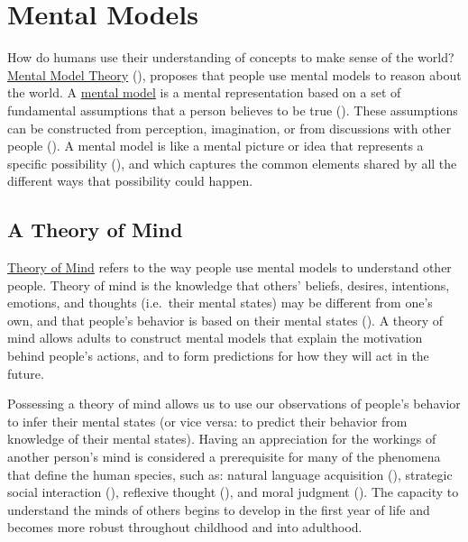 \documentclass[
]{krantz}
\begin{document}
\section{Mental Models}\label{mental-models}

How do humans use their understanding of concepts to make sense of the world? \hyperref[mental-model-theory]{Mental Model Theory} (), proposes that people use mental models to reason about the world. A \hyperref[mental-model]{mental model} is a mental representation based on a set of fundamental assumptions that a person believes to be true (). These assumptions can be constructed from perception, imagination, or from discussions with other people (). A mental model is like a mental picture or idea that represents a specific possibility (), and which captures the common elements shared by all the different ways that possibility could happen.

\subsection*{A Theory of Mind}\label{a-theory-of-mind}


\hyperref[theory-of-mind]{Theory of Mind} refers to the way people use mental models to understand other people. Theory of mind is the knowledge that others' beliefs, desires, intentions, emotions, and thoughts (i.e.~their mental states) may be different from one's own, and that people's behavior is based on their mental states (). A theory of mind allows adults to construct mental models that explain the motivation behind people's actions, and to form predictions for how they will act in the future.

Possessing a theory of mind allows us to use our observations of people's behavior to infer their mental states (or vice versa: to predict their behavior from knowledge of their mental states). Having an appreciation for the workings of another person's mind is considered a prerequisite for many of the phenomena that define the human species, such as: natural language acquisition (), strategic social interaction (), reflexive thought (), and moral judgment (). The capacity to understand the minds of others begins to develop in the first year of life and becomes more robust throughout childhood and into adulthood.
\end{document}
